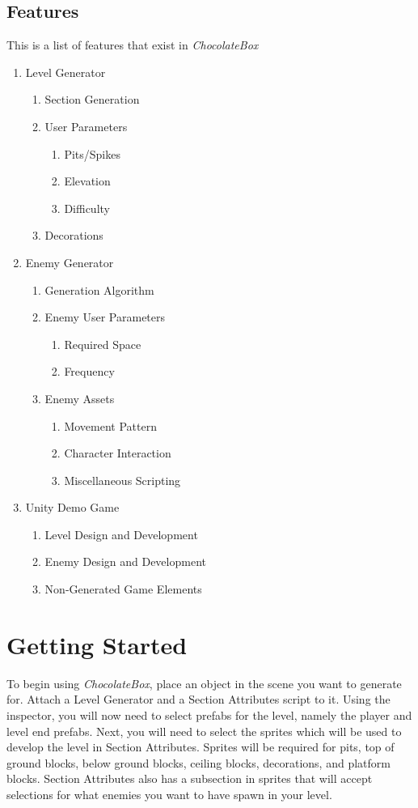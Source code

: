 \documentclass[pdftex,12pt,letter]{article}
\begin{document}
\subsection{Features}
This is a list of features that exist in \textit{ChocolateBox}
\begin{enumerate}
\item Level Generator
\begin{enumerate}
\item Section Generation
\item User Parameters
\begin{enumerate}
\item Pits/Spikes
\item Elevation
\item Difficulty
\end{enumerate}
\item Decorations
\end{enumerate}

\item Enemy Generator
\begin{enumerate}
\item Generation Algorithm
\item Enemy User Parameters
\begin{enumerate}
\item Required Space
\item Frequency
\end{enumerate}
\item Enemy Assets
\begin{enumerate}
\item Movement Pattern
\item Character Interaction
\item Miscellaneous Scripting
\end{enumerate}
\end{enumerate}

\item{Unity Demo Game}
\begin{enumerate}
\item Level Design and Development
\item Enemy Design and Development
\item Non-Generated Game Elements
\end{enumerate}
\end{enumerate}

\section{Getting Started}
To begin using \textit{ChocolateBox}, place an object in the scene you want to generate for. Attach a Level Generator and a Section Attributes script to it.  Using the inspector, you will now need to select prefabs for the level, namely the player and level end prefabs. Next, you will need to select the sprites which will be used to develop the level in Section Attributes. Sprites will be required for pits, top of ground blocks, below ground blocks, ceiling blocks, decorations, and platform blocks. Section Attributes also has a subsection in sprites that will accept selections for what enemies you want to have spawn in your level. 
\end{document}
